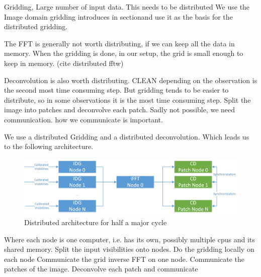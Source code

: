 Gridding, Large number of input data. This needs to be distributed
We use the Image domain gridding introduces in sectionand use it as the basis for the distributed gridding.

The FFT is generally not worth distributing, if we can keep all the data in memory. When the gridding is done, in our setup, the grid is small enough to keep in memory. (cite distributed fftw)

Deconvolution is also worth distributing. CLEAN depending on the observation is the second most time consuming step. But gridding tends to be easier to distribute, so in some observations it is the most time consuming step.
Split the image into patches and deconvolve each patch.
Sadly not possible, we need communication. how we communicate is important.

We use a distributed Gridding and a distributed deconvolution. Which leads us to the following architecture.

\begin{figure}[h]
	\centering
	\includegraphics[width=0.80\linewidth]{./chapters/03.distribution/distributed_architecture.png}
	\caption{Distributed architecture for half a major cycle}
	\label{dist:architecture:fig}
\end{figure}

Where each node is one computer, i.e. has its own, possibly multiple cpus and its shared memory.
Split the input visibilities onto nodes. 
Do the gridding locally on each node
Communicate the grid
inverse FFT on one node.
Communicate the patches of the image.
Deconvolve each patch and communicate
